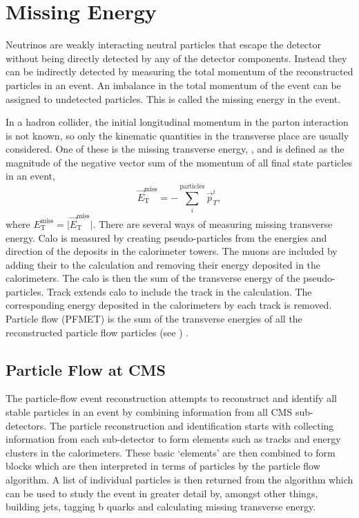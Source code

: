 \section{Missing Energy} 
Neutrinos are weakly interacting neutral particles that escape the
detector without being directly detected by any of the detector components. 
Instead they can be indirectly detected by measuring the total momentum of the
reconstructed particles in an event.
An imbalance in the total momentum of the event can be assigned to undetected
particles. 
This is called the missing energy in the event.

In a hadron collider, the initial longitudinal momentum in the parton
interaction is not
known, so only the kinematic quantities in the transverse place are usually
considered.  One of these is the missing transverse energy, \ETm, and is defined
as the magnitude of the negative vector sum of the momentum of all final state particles in an
event,
\begin{equation}
\vec{E}^{\text{miss}}_{\text{T}} = -\sum_i^{\text{particles}} \vec{p}_{T}^{i},
\end{equation}
where ${E}^{\text{miss}}_{\text{T}} = \vert \vec{E}^{\text{miss}}_{\text{T}}
\vert $.
There are several ways of measuring missing transverse energy.
Calo \ETm is measured by creating pseudo-particles from the energies and
direction of the deposits in the calorimeter towers. The muons are included by
adding their \Pt to the calculation and removing their energy deposited in the
calorimeters. The calo \ETm is then the sum of the transverse energy of the
pseudo-particles.
Track \ETm extends calo \ETm to include the track \Pt in the calculation.  The
corresponding energy deposited in the calorimeters by each track is removed.
Particle flow \ETm (PFMET) is the sum of the transverse energies of all the
reconstructed particle flow particles (see ) \cite{PF}.

\subsection{Particle Flow at CMS}
\label{sec:pf}
The particle-flow event reconstruction attempts to reconstruct and identify all
stable particles in an event by combining information from all CMS
sub-detectors. The particle reconstruction and identification starts with
collecting information from each sub-detector to form elements such as tracks
and energy clusters in the calorimeters. These basic `elements' are then
combined to form blocks which are then interpreted in terms of particles by the
particle flow algorithm. A list of individual particles is then returned from
the algorithm which can be used to study the event in greater detail by,
amongst other things, building jets, tagging b quarks and calculating missing
transverse energy\cite{PF}.

